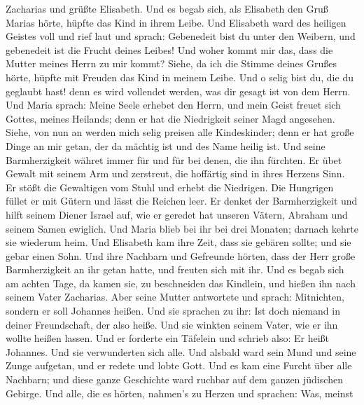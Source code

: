 Zacharias und grüßte Elisabeth.  Und es begab sich, als
Elisabeth den Gruß Marias hörte, hüpfte das Kind in ihrem Leibe. Und
Elisabeth ward des heiligen Geistes voll  und rief laut und
sprach: Gebenedeit bist du unter den Weibern, und gebenedeit ist die
Frucht deines Leibes!  Und woher kommt mir das, dass die
Mutter meines Herrn zu mir kommt?  Siehe, da ich die Stimme
deines Grußes hörte, hüpfte mit Freuden das Kind in meinem Leibe.
 Und o selig bist du, die du geglaubt hast! denn es wird
vollendet werden, was dir gesagt ist von dem Herrn.  Und
Maria sprach: Meine Seele erhebet den Herrn,  und mein
Geist freuet sich Gottes, meines Heilands;  denn er hat die
Niedrigkeit seiner Magd angesehen. Siehe, von nun an werden mich selig
preisen alle Kindeskinder;  denn er hat große Dinge an mir
getan, der da mächtig ist und des Name heilig ist.  Und
seine Barmherzigkeit währet immer für und für bei denen, die ihn
fürchten.  Er übet Gewalt mit seinem Arm und zerstreut, die
hoffärtig sind in ihres Herzens Sinn.  Er stößt die
Gewaltigen vom Stuhl und erhebt die Niedrigen.  Die
Hungrigen füllet er mit Gütern und lässt die Reichen leer. 
Er denket der Barmherzigkeit und hilft seinem Diener Israel auf,
 wie er geredet hat unseren Vätern, Abraham und seinem
Samen ewiglich.  Und Maria blieb bei ihr bei drei Monaten;
darnach kehrte sie wiederum heim.  Und Elisabeth kam ihre
Zeit, dass sie gebären sollte; und sie gebar einen Sohn. 
Und ihre Nachbarn und Gefreunde hörten, dass der Herr große
Barmherzigkeit an ihr getan hatte, und freuten sich mit ihr.
 Und es begab sich am achten Tage, da kamen sie, zu
beschneiden das Kindlein, und hießen ihn nach seinem Vater Zacharias.
 Aber seine Mutter antwortete und sprach: Mitnichten,
sondern er soll Johannes heißen.  Und sie sprachen zu ihr:
Ist doch niemand in deiner Freundschaft, der also heiße. 
Und sie winkten seinem Vater, wie er ihn wollte heißen lassen.
 Und er forderte ein Täfelein und schrieb also: Er heißt
Johannes. Und sie verwunderten sich alle.  Und alsbald ward
sein Mund und seine Zunge aufgetan, und er redete und lobte Gott.
 Und es kam eine Furcht über alle Nachbarn; und diese ganze
Geschichte ward ruchbar auf dem ganzen jüdischen Gebirge. 
Und alle, die es hörten, nahmen's zu Herzen und sprachen: Was, meinst
